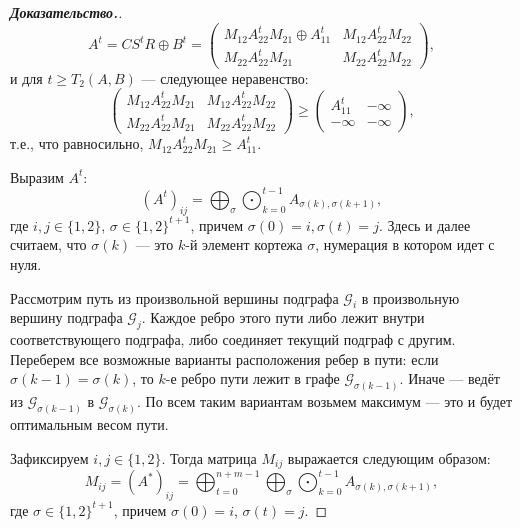 \documentclass[12pt]{article}
\begin{document}
\begin{proof}[\textbf{Доказательство.}]
\begin{equation*}
A^t = CS^tR \oplus B^t = \begin{pmatrix}
	M_{12}A_{22}^tM_{21} \oplus A_{11}^t & M_{12}A_{22}^tM_{22} \\
	M_{22}A_{22}^tM_{21} & M_{22}A_{22}^tM_{22}
\end{pmatrix},
\end{equation*}
и для $t \ge T_2(A, B)$ --- следующее неравенство:
\begin{equation*}
\begin{pmatrix}
	M_{12}A_{22}^tM_{21} & M_{12}A_{22}^tM_{22} \\
	M_{22}A_{22}^tM_{21} & M_{22}A_{22}^tM_{22}
\end{pmatrix} \ge \begin{pmatrix}
A_{11}^t & -\infty \\
-\infty & -\infty
\end{pmatrix},
\end{equation*} т.е., что равносильно, $M_{12}A_{22}^tM_{21} \ge A_{11}^t$.

Выразим $A^t$: 
\begin{equation*}
(A^t)_{ij} = \bigoplus_{\sigma}\bigodot_{k = 0}^{t - 1} A_{\sigma(k), \sigma(k + 1)},
\end{equation*}
где $i, j \in \{1, 2\}$, $\sigma \in \{1, 2\}^{t + 1}$, причем $\sigma(0) = i, \sigma(t) = j$. Здесь и далее считаем, что $\sigma(k)$ --- это $k$-й элемент кортежа $\sigma$, нумерация в котором идет с нуля.

Рассмотрим путь из произвольной вершины подграфа $\mathcal{G}_i$ в произвольную вершину подграфа $\mathcal{G}_j$. Каждое ребро этого пути либо лежит внутри соответствующего подграфа, либо соединяет текущий подграф с другим. Переберем все возможные варианты расположения ребер в пути: если $\sigma(k-1) = \sigma(k)$, то $k$-е ребро пути лежит в графе $\mathcal{G}_{\sigma(k-1)}$. Иначе --- ведёт из $\mathcal{G}_{\sigma(k-1)}$ в $\mathcal{G}_{\sigma(k)}$. По всем таким вариантам возьмем максимум --- это и будет оптимальным весом пути.

Зафиксируем $i, j \in \{1, 2\}$. Тогда матрица $M_{ij}$ выражается следующим образом:
\begin{equation*}
M_{ij} = (A^*)_{ij} = \bigoplus_{t = 0}^{n + m - 1}\bigoplus_{\sigma}\bigodot_{k = 0}^{t - 1} A_{\sigma(k), \sigma(k + 1)},
\end{equation*}
где $\sigma \in \{1, 2\}^{t + 1}$, причем $\sigma(0) = i$, $\sigma(t) = j$.
\end{proof}
\end{document}
